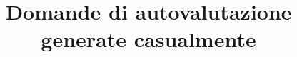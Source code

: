 \documentclass[a4paper]{exam}
\title{Domande di autovalutazione generate casualmente}
\begin{document}
\maketitle
\begin{questions}

\end{questions}
\end{document}
